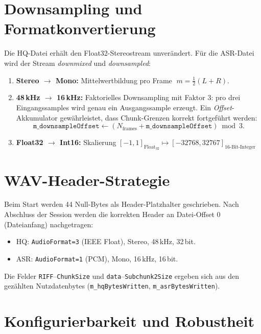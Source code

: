 \section{Downsampling und Formatkonvertierung}
\label{sec:wav_downsampling}

Die HQ-Datei erhält den Float32-Stereostream unverändert. Für die ASR-Datei wird der Stream \emph{downmixed} und \emph{downsampled}:
\begin{enumerate}
    \item \textbf{Stereo $\rightarrow$ Mono:} Mittelwertbildung pro Frame \(\;m = \tfrac{1}{2}(L + R)\).

    \item \textbf{48\,kHz $\rightarrow$ 16\,kHz:} Faktorielles Downsampling mit Faktor \(3\): pro drei Eingangssamples wird genau ein Ausgangssample erzeugt. Ein \emph{Offset}-Akkumulator gewährleistet, dass Chunk-Grenzen korrekt fortgeführt werden:
    \[
    \texttt{m\_downsampleOffset} \leftarrow (N_\text{frames} + \texttt{m\_downsampleOffset}) \bmod 3.
    \]

    \item \textbf{Float32 $\rightarrow$ Int16:} Skalierung \([-1,1]_{\text{Float}_{32}} \mapsto [-32768,32767]_{\text{16-Bit-Integer}}\)
\end{enumerate}



\section{WAV-Header-Strategie}
\label{sec:wav_headers}

Beim Start werden 44 Null-Bytes als Header-Platzhalter geschrieben. Nach Abschluss der Session werden die korrekten Header an Datei-Offset \(0\) (Dateianfang) nachgetragen:

\begin{itemize}
    \item HQ: \texttt{AudioFormat=3} (IEEE Float), Stereo, 48\,kHz, 32\,bit.

    \item ASR: \texttt{AudioFormat=1} (PCM), Mono, 16\,kHz, 16\,bit.
\end{itemize}

Die Felder \texttt{RIFF}–\texttt{ChunkSize} und \texttt{data}–\texttt{Subchunk2Size} ergeben sich aus den gezählten Nutzdatenbytes (\texttt{m\_hqBytesWritten}, \texttt{m\_asrBytesWritten}).


\section{Konfigurierbarkeit und Robustheit}
\label{sec:wav_config}

